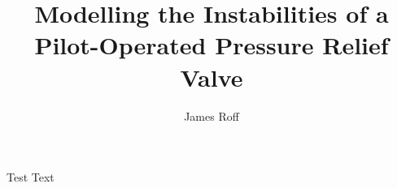 \documentclass[svgnames,fragile]{beamer}
\subtitle{}
\institute[]{Department of Engineering Mathematics\\ University of Bristol}
\author{James Roff}
\date{}
\title[Instabilities of Pilot-Operated PRVs]{Modelling the Instabilities of a Pilot-Operated Pressure Relief Valve}
\begin{document}
\frame{\titlepage}

\begin{frame}{Test}
    Text 
\end{frame}
\end{document}
